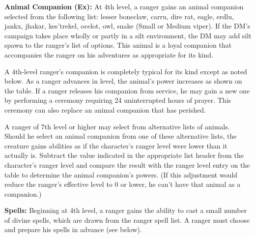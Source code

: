 \textbf{Animal Companion (Ex):} At 4th level, a ranger gains an animal companion selected from the following list: lesser boneclaw, carru, dire rat, eagle, erdlu, jankx, jhakar, kes'trekel, ocelot, owl, snake (Small or Medium viper). If the DM's campaign takes place wholly or partly in a silt environment, the DM may add silt spawn to the ranger's list of options. This animal is a loyal companion that accompanies the ranger on his adventures as appropriate for its kind. 

A 4th-level ranger's companion is completely typical for its kind except as noted below. As a ranger advances in level, the animal's power increases as shown on the table. If a ranger releases his companion from service, he may gain a new one by performing a ceremony requiring 24 uninterrupted hours of prayer. This ceremony can also replace an animal companion that has perished.

A ranger of 7th level or higher may select from alternative lists of animals. Should he select an animal companion from one of these alternative lists, the creature gains abilities as if the character's ranger level were lower than it actually is. Subtract the value indicated in the appropriate list header from the character's ranger level and compare the result with the ranger level entry on the table to determine the animal companion's powers. (If this adjustment would reduce the ranger's effective level to 0 or lower, he can't have that animal as a companion.)



\textbf{Spells:} Beginning at 4th level, a ranger gains the ability to cast a small number of divine spells, which are drawn from the ranger spell list. A ranger must choose and prepare his spells in advance (see below).

